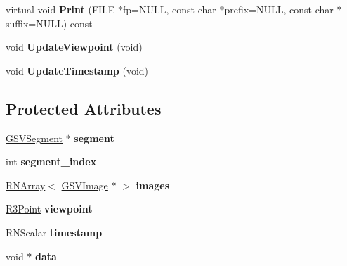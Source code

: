 \begin{DoxyCompactItemize}
\item 
virtual void {\bfseries Print} (F\+I\+LE $\ast$fp=N\+U\+LL, const char $\ast$prefix=N\+U\+LL, const char $\ast$suffix=N\+U\+LL) const \hypertarget{class_g_s_v_panorama_adceb3e87bf49a16dde460380fa65e621}{}\label{class_g_s_v_panorama_adceb3e87bf49a16dde460380fa65e621}

\item 
void {\bfseries Update\+Viewpoint} (void)\hypertarget{class_g_s_v_panorama_a46d254e7a14d63b32dce03e287406bcb}{}\label{class_g_s_v_panorama_a46d254e7a14d63b32dce03e287406bcb}

\item 
void {\bfseries Update\+Timestamp} (void)\hypertarget{class_g_s_v_panorama_ac9b1b76f1eaf751cf99bf0b47f65f10f}{}\label{class_g_s_v_panorama_ac9b1b76f1eaf751cf99bf0b47f65f10f}

\end{DoxyCompactItemize}
\subsection*{Protected Attributes}
\begin{DoxyCompactItemize}
\item 
\hyperlink{class_g_s_v_segment}{G\+S\+V\+Segment} $\ast$ {\bfseries segment}\hypertarget{class_g_s_v_panorama_a13c99d4d5f144ed76b082b2938730ce4}{}\label{class_g_s_v_panorama_a13c99d4d5f144ed76b082b2938730ce4}

\item 
int {\bfseries segment\+\_\+index}\hypertarget{class_g_s_v_panorama_a8c0a2a54ca1f49edcad4c684e4778315}{}\label{class_g_s_v_panorama_a8c0a2a54ca1f49edcad4c684e4778315}

\item 
\hyperlink{class_r_n_array}{R\+N\+Array}$<$ \hyperlink{class_g_s_v_image}{G\+S\+V\+Image} $\ast$ $>$ {\bfseries images}\hypertarget{class_g_s_v_panorama_a73aeb6bf2e6861fd3dc9fb1cd53ea5ee}{}\label{class_g_s_v_panorama_a73aeb6bf2e6861fd3dc9fb1cd53ea5ee}

\item 
\hyperlink{class_r3_point}{R3\+Point} {\bfseries viewpoint}\hypertarget{class_g_s_v_panorama_ace1a80c21d180105ce1a61bb7d6d993e}{}\label{class_g_s_v_panorama_ace1a80c21d180105ce1a61bb7d6d993e}

\item 
R\+N\+Scalar {\bfseries timestamp}\hypertarget{class_g_s_v_panorama_acb69aaa8521fbc57afad0643b191cc84}{}\label{class_g_s_v_panorama_acb69aaa8521fbc57afad0643b191cc84}

\item 
void $\ast$ {\bfseries data}\hypertarget{class_g_s_v_panorama_adf0f6e0c6008c7f5b761a4064d2aefde}{}\label{class_g_s_v_panorama_adf0f6e0c6008c7f5b761a4064d2aefde}

\end{DoxyCompactItemize}

